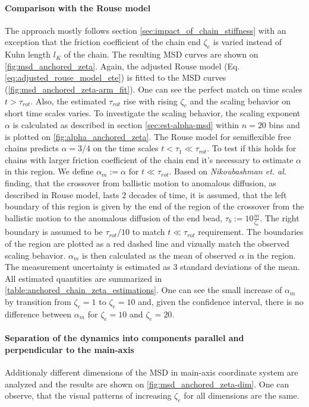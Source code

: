 \documentclass[
    paper=A4,pagesize=automedia,fontsize=12pt,
    BCOR=15mm,DIV=22,
    twoside,headinclude,footinclude=false,
    fleqn,             %
    bibliography=totocnumbered,          %
    listof=totoc,                %
    listof=flat,                 %
    cleardoublepage=empty      %
    numbers=endperiod
]{scrartcl}
\begin{document}
\paragraph{Comparison with the Rouse model}
The approach mostly follows section \ref{sec:impact_of_chain_stiffness} with an exception that
the friction coefficient of the chain end $\zeta_e$ is varied instead of Kuhn length $l_K$ 
of the chain. The resulting MSD curves are shown on 
\autoref{fig:msd_anchored_zeta}. Again, the adjusted Rouse model 
(Eq. \ref{eq:adjusted_rouse_model_ete}) is fitted to
the MSD curves (\autoref{fig:msd_anchored_zeta-arm_fit}). One can see
the perfect match on time scales $t > \tau_{rot}$. Also, the estimated $\tau_{rot}$
rise with rising $\zeta_e$ and the scaling behavior on short time scales 
varies. To investigate the scaling behavior, the scaling exponent $\alpha$ is
calculated as described in section \ref{sec:est-alpha-msd} 
within $n=20$ bins and is plotted on \autoref{fig:alpha_anchored_zeta}.
The Rouse model for semiflexible free chains predicts $\alpha=3/4$ on the
time scales $t < \tau_{1} \ll \tau_{rot}$. To test if this holds for chains with larger
friction coefficient of the chain end it's necessary to estimate $\alpha$ in this
region. We define $\alpha_m := \alpha \text{ for } t \ll \tau_{rot}$.
Based on \emph{Nikoubashman et. al.} \cite{Nikoubashman2016} finding,
that the crossover from ballistic motion to anomalous diffusion, as described 
in Rouse model, lasts 2 decades of time, it is assumed, 
that the left boundary of this region is given by the end of the region of the 
crossover from the ballistic
motion to the anomalous diffusion of the end bead, $\tau_b  := 10 \frac{m}{\zeta_e}$. 
The right boundary is
assumed to be $\tau_{rot} / 10$ to match $t \ll \tau_{rot}$ requirement.
The boundaries of the region are plotted as a red dashed line and vizually match
the observed scaling behavior. $\alpha_m$ is then calculated as the mean
of observed $\alpha$ in the region. The measurement uncertainty is estimated
as 3 standard deviations of the mean. All estimated quantities are summarized
in \autoref{table:anchored_chain_zeta_estimations}. One can see the 
small increase of $\alpha_m$ by transition from $\zeta_e=1$ to $\zeta_e=10$ and, 
given the confidence interval, there is no difference between 
$\alpha_m$ for $\zeta_e = 10$ and $\zeta_e=20$.

\paragraph{Separation of the dynamics into components parallel and perpendicular to
the main-axis}
Additionaly different dimensions of the MSD in main-axis coordinate system are
analyzed and the results are shown on \autoref{fig:msd_anchored_zeta-dim}.
One can observe, that the visual patterns of 
increasing $\zeta_e$ for all dimensions are the same.
\end{document}
